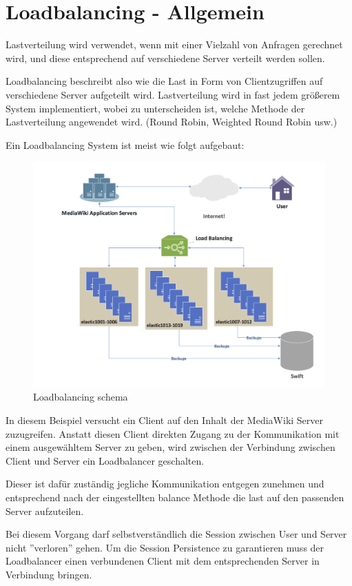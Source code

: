 \section{Loadbalancing - Allgemein}
Lastverteilung wird verwendet, wenn mit einer Vielzahl von Anfragen gerechnet wird, und diese entsprechend auf verschiedene Server verteilt werden sollen.

Loadbalancing beschreibt also wie die Last in Form von Clientzugriffen auf verschiedene Server aufgeteilt wird.
Lastverteilung wird in fast jedem größerem System implementiert, wobei zu unterscheiden ist, welche Methode der Lastverteilung angewendet wird. (Round Robin, Weighted Round Robin usw.)

Ein Loadbalancing System ist meist wie folgt aufgebaut:

\begin{figure}[!h]
\centering
\includegraphics[width=0.7\linewidth]{images/load}
\caption[Loadbalancing schema]{Loadbalancing schema \cite{wiki}}
\label{fig:load}
\end{figure}

In diesem Beispiel versucht ein Client auf den Inhalt der MediaWiki Server zuzugreifen. Anstatt diesen Client direkten Zugang zu der Kommunikation mit einem ausgewähltem Server zu geben, wird zwischen der Verbindung zwischen Client und Server ein Loadbalancer geschalten.

Dieser ist dafür zuständig jegliche Kommunikation entgegen zunehmen und entsprechend nach der eingestellten balance Methode die last auf den passenden Server aufzuteilen.

Bei diesem Vorgang darf selbstverständlich die Session zwischen User und Server nicht ''verloren'' gehen. Um die Session Persistence zu garantieren muss der Loadbalancer einen verbundenen Client mit dem entsprechenden Server in Verbindung bringen.

